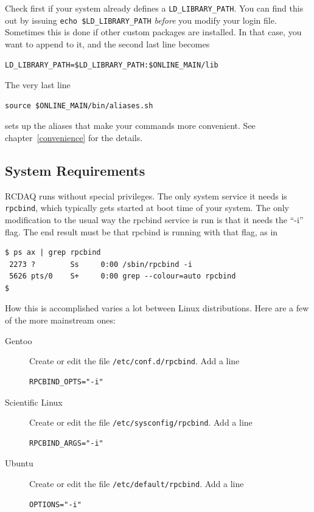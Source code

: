 \documentclass{article}[11pt]
\begin{document}
Check first if your system already defines a
\verb|LD_LIBRARY_PATH|. You can find this out by issuing
\verb|echo $LD_LIBRARY_PATH| \emph{before} you modify your login
file. Sometimes this is done if other custom packages are
installed. In that case, you want to append to it, and the
second last line becomes

\begin{verbatim} 
LD_LIBRARY_PATH=$LD_LIBRARY_PATH:$ONLINE_MAIN/lib
\end{verbatim}

The very last line 
\begin{verbatim} 
source $ONLINE_MAIN/bin/aliases.sh
\end{verbatim}

sets up the aliases that make your commands more convenient. See
chapter~\ref{convenience} for the details. 



\subsection{System Requirements}

RCDAQ runs without special privileges. The only system service it
needs is \verb|rpcbind|, which typically gets started at boot time of
your system. The only modification to the usual way the rpcbind
service is run is that it needs the ``-i'' flag. The end result must be that rpcbind is running 
with that flag, as in

\begin{verbatim} 
$ ps ax | grep rpcbind
 2273 ?        Ss     0:00 /sbin/rpcbind -i
 5626 pts/0    S+     0:00 grep --colour=auto rpcbind
$
\end{verbatim}

How this is accomplished varies a lot between Linux distributions. Here are a few of the 
more mainstream ones:

\begin{description}

\item[Gentoo]  Create or edit the file \verb|/etc/conf.d/rpcbind|. Add a line

\begin{verbatim} 
RPCBIND_OPTS="-i"  
\end{verbatim}

\item[Scientific Linux]  Create or edit the file \verb|/etc/sysconfig/rpcbind|. Add a line

\begin{verbatim} 
RPCBIND_ARGS="-i"  
\end{verbatim}

\item[Ubuntu]  Create or edit the file \verb|/etc/default/rpcbind|. Add a line

\begin{verbatim} 
OPTIONS="-i"  
\end{verbatim}

\end{description}
\end{document}
